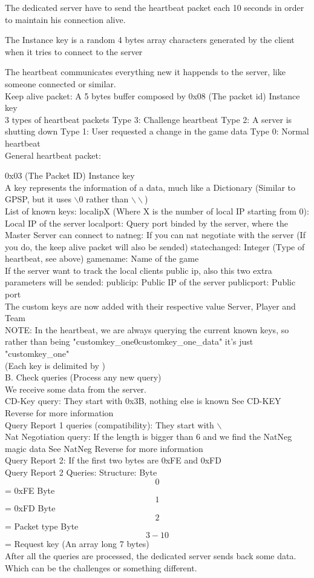 \documentclass[oneside,titlepage,a4paper]{Definition/retrospy} %
\begin{document}
The dedicated server have to send the heartbeat packet each 10 seconds in order to maintain his connection
alive.

The Instance key is a random 4 bytes array characters generated by the client when it tries
to connect to the server

The heartbeat communicates everything new it happends to the server, like someone connected or similar.
\\
Keep alive packet:
A 5 bytes buffer composed by
0x08 (The packet id)
Instance key
\\
3 types of heartbeat packets
Type 3: Challenge heartbeat
Type 2: A server is shutting down
Type 1: User requested a change in the game data
Type 0: Normal heartbeat
\\
General heartbeat packet:

0x03 (The Packet ID)
Instance key
\\
A key represents the information of a data, much like a Dictionary (Similar to GPSP, but it uses $\backslash$0 rather than $\backslash\backslash$) 
\\
List of known keys:
localipX (Where X is the number of local IP starting from 0): Local IP of the server
localport: Query port binded by the server, where the Master Server can connect to
natneg: If you can nat negotiate with the server (If you do, the keep alive packet will also be sended)
statechanged: Integer (Type of heartbeat, see above)
gamename: Name of the game
\\
If the server want to track the local clients public ip, also this two extra parameters will be sended:
publicip: Public IP of the server
publicport: Public port
\\
The custom keys are now added with their respective value
Server, Player and Team
\\

NOTE: In the heartbeat, we are always querying the current known keys, so
rather than being "customkey\_one\tbs0customkey\_one\_data" it's just "customkey\_one"
\\
(Each key is delimited by )
\\
B. Check queries (Process any new query)
\\
We receive some data from the server.
\\
CD-Key query:
They start with 0x3B, nothing else is known
See CD-KEY Reverse for more information
\\
Query Report 1 queries (compatibility):
They start with $\backslash$
\\
Nat Negotiation query:
If the length is bigger than 6 and we find the NatNeg magic data
See NatNeg Reverse for more information
\\
Query Report 2:
If the first two bytes are 0xFE and 0xFD
\\
Query Report 2 Queries:
Structure:
Byte \[0\] = 0xFE
Byte \[1\] = 0xFD
Byte \[2\] = Packet type
Byte \[3-10\] = Request key (An array long 7 bytes)
\\
After all the queries are processed, the dedicated server sends back some data.
Which can be the challenges or something different.
\end{document}
